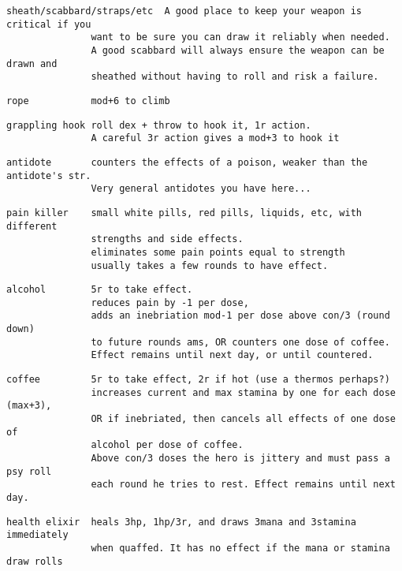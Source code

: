 \small \begin{samepage} \begin{verbatim}
sheath/scabbard/straps/etc  A good place to keep your weapon is critical if you
               want to be sure you can draw it reliably when needed.
               A good scabbard will always ensure the weapon can be drawn and
               sheathed without having to roll and risk a failure.
\end{verbatim} \blocklistgap \begin{verbatim}
rope           mod+6 to climb
\end{verbatim} \blocklistgap \begin{verbatim}
grappling hook roll dex + throw to hook it, 1r action.
               A careful 3r action gives a mod+3 to hook it
\end{verbatim} \blocklistgap \begin{verbatim}
antidote       counters the effects of a poison, weaker than the antidote's str.
               Very general antidotes you have here...
\end{verbatim} \blocklistgap \begin{verbatim}
pain killer    small white pills, red pills, liquids, etc, with different
               strengths and side effects.
               eliminates some pain points equal to strength
               usually takes a few rounds to have effect.
\end{verbatim} \blocklistgap \begin{verbatim}
alcohol        5r to take effect.
               reduces pain by -1 per dose,
               adds an inebriation mod-1 per dose above con/3 (round down)
               to future rounds ams, OR counters one dose of coffee.
               Effect remains until next day, or until countered.
\end{verbatim} \blocklistgap \begin{verbatim}
coffee         5r to take effect, 2r if hot (use a thermos perhaps?)
               increases current and max stamina by one for each dose (max+3),
               OR if inebriated, then cancels all effects of one dose of
               alcohol per dose of coffee.
               Above con/3 doses the hero is jittery and must pass a psy roll
               each round he tries to rest. Effect remains until next day.
\end{verbatim} \blocklistgap \begin{verbatim}
health elixir  heals 3hp, 1hp/3r, and draws 3mana and 3stamina immediately
               when quaffed. It has no effect if the mana or stamina draw rolls

\end{verbatim}
\end{samepage}
